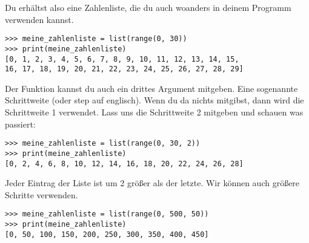 \noindent
Du erhältst also eine Zahlenliste, die du auch woanders in deinem Programm verwenden kannst.

\begin{Verbatim}[frame=single]
>>> meine_zahlenliste = list(range(0, 30))
>>> print(meine_zahlenliste)
[0, 1, 2, 3, 4, 5, 6, 7, 8, 9, 10, 11, 12, 13, 14, 15,
16, 17, 18, 19, 20, 21, 22, 23, 24, 25, 26, 27, 28, 29]
\end{Verbatim}

\noindent
Der  Funktion kannst du auch ein drittes Argument mitgeben. Eine sogenannte Schrittweite (oder step auf englisch). Wenn du da nichts mitgibst, dann wird die Schrittweite 1 verwendet. Lass uns die Schrittweite 2 mitgeben und schauen was passiert:

\begin{Verbatim}[frame=single]
>>> meine_zahlenliste = list(range(0, 30, 2))
>>> print(meine_zahlenliste)
[0, 2, 4, 6, 8, 10, 12, 14, 16, 18, 20, 22, 24, 26, 28]
\end{Verbatim}

\noindent
Jeder Eintrag der Liste ist um 2 größer als der letzte. Wir können auch größere Schritte verwenden.

\begin{Verbatim}[frame=single]
>>> meine_zahlenliste = list(range(0, 500, 50))
>>> print(meine_zahlenliste)
[0, 50, 100, 150, 200, 250, 300, 350, 400, 450]
\end{Verbatim}


